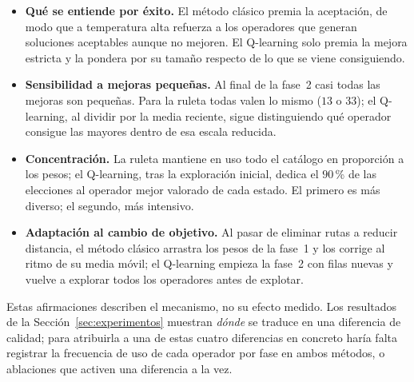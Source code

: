 \begin{itemize}
\item \textbf{Qué se entiende por éxito.} El método clásico premia la aceptación, de modo que
a temperatura alta refuerza a los operadores que generan soluciones aceptables aunque no
mejoren. El Q-learning solo premia la mejora estricta y la pondera por su tamaño respecto de
lo que se viene consiguiendo.
\item \textbf{Sensibilidad a mejoras pequeñas.} Al final de la fase~2 casi todas las mejoras
son pequeñas. Para la ruleta todas valen lo mismo ($13$ o $33$); el Q-learning, al dividir
por la media reciente, sigue distinguiendo qué operador consigue las mayores dentro de esa
escala reducida.
\item \textbf{Concentración.} La ruleta mantiene en uso todo el catálogo en proporción a los
pesos; el Q-learning, tras la exploración inicial, dedica el $90$\,\% de las elecciones al
operador mejor valorado de cada estado. El primero es más diverso; el segundo, más
intensivo.
\item \textbf{Adaptación al cambio de objetivo.} Al pasar de eliminar rutas a reducir
distancia, el método clásico arrastra los pesos de la fase~1 y los corrige al ritmo de su
media móvil; el Q-learning empieza la fase~2 con filas nuevas y vuelve a explorar todos los
operadores antes de explotar.
\end{itemize}

Estas afirmaciones describen el mecanismo, no su efecto medido. Los resultados de la
Sección~\ref{sec:experimentos} muestran \emph{dónde} se traduce en una diferencia de calidad;
para atribuirla a una de estas cuatro diferencias en concreto haría falta registrar la
frecuencia de uso de cada operador por fase en ambos métodos, o ablaciones que activen una
diferencia a la vez.
